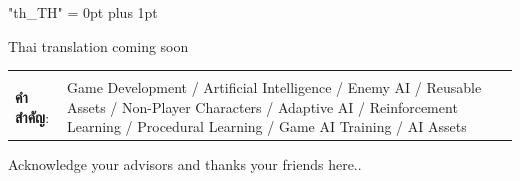 \documentclass[12pt,oneside,openright,a4paper]{cpe-english-project}
\begin{document}
{
\XeTeXlinebreaklocale "th_TH"	
\XeTeXlinebreakskip = 0pt plus 1pt
\thaifont
\thaiabstract

Thai translation coming soon

\begin{flushleft}
\begin{tabular*}{\textwidth}{@{}lp{}}
 & \\

\textbf{คำสำคัญ}: & Game Development / Artificial Intelligence / Enemy AI / Reusable Assets / Non-Player Characters / Adaptive AI / Reinforcement Learning / Procedural Learning / Game AI Training / AI Assets
\end{tabular*}
\end{flushleft}
\endabstract
}

\preface
Acknowledge your advisors and thanks your friends here..

\tableofcontents                    
\listoftables
\listoffigures                      
\end{document}
